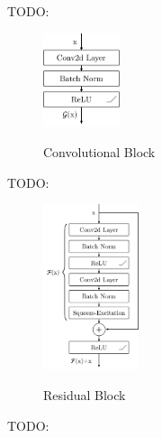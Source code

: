 TODO:

\begin{figure}
    \includegraphics[width=0.2\textwidth]{res/pictures/conv-block.pdf}
    \centering
    \caption[Convolutional Block]{\unskip}
    Convolutional Block
    \label{fig:conv-block}
\end{figure}

TODO:

\begin{figure}
    \includegraphics[width=0.25\textwidth]{res/pictures/res-block.pdf}
    \centering
    \caption[Residual Block]{\unskip}
    Residual Block
    \label{fig:resblock}
\end{figure}

TODO:

